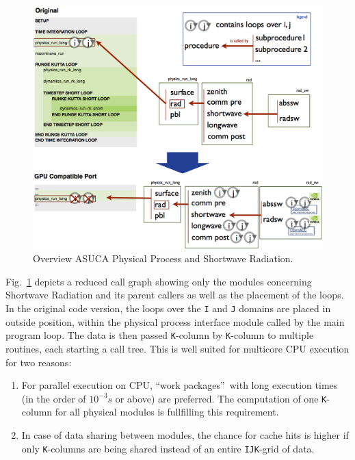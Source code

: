 \begin{figure}[htpb]
	\centering
	\includegraphics[width=14cm]{figures/radswOverview}
	\caption[Overview ASUCA Physical Process and Shortwave Radiation]{Overview ASUCA Physical Process and Shortwave Radiation.}
	\label{figure:overviewRadSW}
\end{figure}

Fig.~\ref{figure:overviewRadSW} depicts a reduced call graph showing only the modules concerning Shortwave Radiation and its parent callers as well as the placement of the loops. In the original code version, the loops over the \verb|I| and \verb|J| domains are placed in outside position, within the physical process interface module called by the main program loop. The data is then passed \verb|K|-column by \verb|K|-column to multiple routines, each starting a call tree. This is well suited for multicore CPU execution for two reasons: 
\begin{enumerate}
 \item For parallel execution on CPU, \textquotedblleft work packages\textquotedblright\ with long execution times (in the order of $10^{-3}\unit{s}$ or above) are preferred. The computation of one \verb|K|-column for all physical modules is fullfilling this requirement.
 \item In case of data sharing between modules, the chance for cache hits is higher if only \verb|K|-columns are being shared instead of an entire \verb|IJK|-grid of data.
\end{enumerate}

